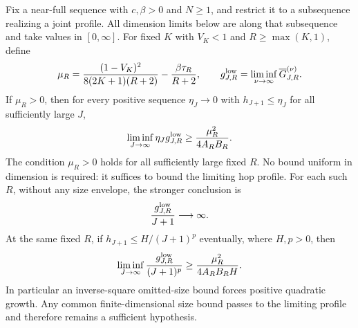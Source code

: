 \begin{corollary}\label{cor:sharing-density}
Fix a near-full sequence with $c,\beta>0$ and $N\ge1$, and restrict it
to a subsequence realizing a joint profile. All dimension limits below
are along that subsequence and take values in $[0,\infty]$. For fixed $K$
with $V_K<1$ and $R\ge\max(K,1)$, define
\[
 \mu_R=\frac{(1-V_K)^2}{8(2K+1)(R+2)}-
                   \frac{\beta\tau_R}{R+2},\qquad
 g^{\rm low}_{J,R}=\liminf_{\nu\to\infty}\overline G_{J,R}^{(\nu)}.
\]
If $\mu_R>0$, then for every positive sequence $\eta_J\to0$ with
$h_{J+1}\le\eta_J$ for all sufficiently large $J$,
\begin{equation}\label{eq:sharing-density}
 \liminf_{J\to\infty}\eta_Jg^{\rm low}_{J,R}
       \ge\frac{\mu_R^2}{4A_RB_R}.
\end{equation}
The condition $\mu_R>0$ holds for all sufficiently large fixed $R$.
No bound uniform in dimension is required: it suffices to bound the
limiting hop profile. For each such $R$, without any size envelope,
the stronger conclusion is
\begin{equation}\label{eq:sharing-superlinear}
 \frac{g^{\rm low}_{J,R}}{J+1}\longrightarrow\infty.
\end{equation}
At the same fixed $R$, if $h_{J+1}\le H/(J+1)^p$ eventually,
where $H,p>0$, then
\[
 \liminf_{J\to\infty}\frac{g^{\rm low}_{J,R}}{(J+1)^p}
 \ge\frac{\mu_R^2}{4A_RB_RH}.
\]
In particular an inverse-square omitted-size bound forces positive
quadratic growth. Any common finite-dimensional size bound passes to
the limiting profile and therefore remains a sufficient hypothesis.
\end{corollary}
